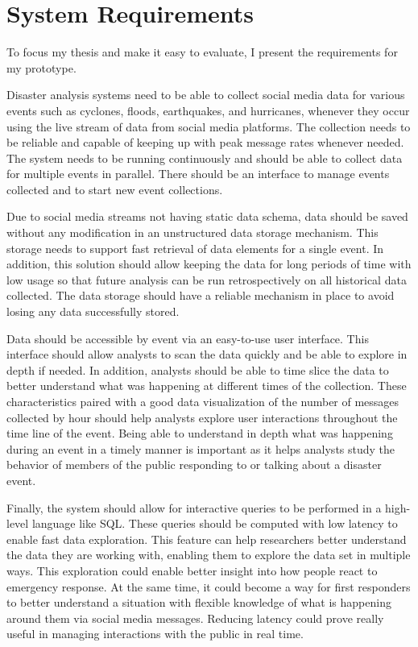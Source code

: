 \chapter{System Requirements}

To focus my thesis and make it easy to evaluate, I present the requirements for my prototype. 

Disaster analysis systems need to be able to collect social media data for various events such as cyclones, floods, earthquakes, and hurricanes, whenever they occur using the live stream of data from social media platforms. The collection needs to be reliable and capable of keeping up with peak message rates whenever needed. The system needs to be running continuously and should be able to collect data for multiple events in parallel. There should be an interface to manage events collected and to start new event collections.

Due to social media streams not having static data schema, data should be saved without any modification in an unstructured data storage mechanism. This storage needs to support fast retrieval of data elements for a single event. In addition, this solution should allow keeping the data for long periods of time with low usage so that future analysis can be run retrospectively on all historical data collected. The data storage should have a reliable mechanism in place to avoid losing any data successfully stored.

Data should be accessible by event via an easy-to-use user interface. This interface should allow analysts to scan the data quickly and be able to explore in depth if needed. In addition, analysts should be able to time slice the data to better understand what was happening at different times of the collection. These characteristics paired with a good data visualization of the number of messages collected by hour should help analysts explore user interactions throughout the time line of the event. Being able to understand in depth what was happening during an event in a timely manner is important as it helps analysts study the behavior of members of the public responding to or talking about a disaster event.

Finally, the system should allow for interactive queries to be performed in a high-level language like SQL. These queries should be computed with low latency to enable fast data exploration. This feature can help researchers better understand the data they are working with, enabling them to explore the data set in multiple ways. This exploration could enable better insight into how people react to emergency response. At the same time, it could become a way for first responders to better understand a situation with flexible knowledge of what is happening around them via social media messages. Reducing latency could prove really useful in managing interactions with the public in real time.

